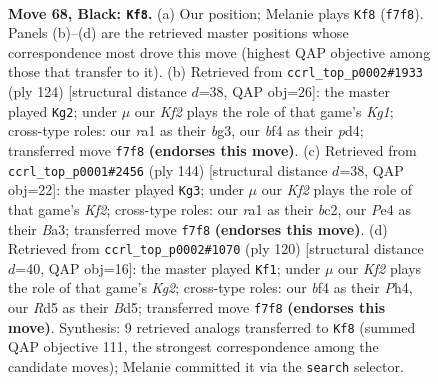 \documentclass[11pt]{article}
\begin{document}
\clearpage

\begin{figure}[p]\centering
\begin{subfigure}{0.46\textwidth}\centering
\resizebox{\linewidth}{!}{%
\newchessgame
\chessboard[
  setfen={8/n1P2k1K/p7/P2r1p1p/4pBb1/6P1/8/RN6 b - - 43 68},
  showmover=false,
  pgfstyle=straightmove, color=movearrow, markmove={f7-f8}
]}
\caption{}
\end{subfigure}\hfill
\begin{subfigure}{0.46\textwidth}\centering
\resizebox{\linewidth}{!}{%
\newchessgame
\chessboard[
  setfen={3r4/2p2k1p/1p6/pP6/P2pB3/3P2b1/2R1P3/6K1 w - - 0 63},
  showmover=false,
  pgfstyle=straightmove, color=movearrow, markmove={g1-g2}
]}
\caption{}
\end{subfigure}
\\[4pt]
\begin{subfigure}{0.46\textwidth}\centering
\resizebox{\linewidth}{!}{%
\newchessgame
\chessboard[
  setfen={8/R7/4r1p1/3k3p/p7/B6P/1Pb2KP1/8 w - - 8 73},
  showmover=false,
  pgfstyle=straightmove, color=movearrow, markmove={f2-g3}
]}
\caption{}
\end{subfigure}\hfill
\begin{subfigure}{0.46\textwidth}\centering
\resizebox{\linewidth}{!}{%
\newchessgame
\chessboard[
  setfen={1R6/2r2pk1/6p1/3B3p/3bPP1P/6P1/6K1/8 w - - 1 61},
  showmover=false,
  pgfstyle=straightmove, color=movearrow, markmove={g2-f1}
]}
\caption{}
\end{subfigure}
\caption{\textbf{Move 68, Black: \texttt{Kf8}.} (a) Our position; Melanie plays \texttt{Kf8} (\texttt{f7f8}). Panels (b)--(d) are the retrieved master positions whose correspondence most drove this move (highest QAP objective among those that transfer to it). (b) Retrieved from \texttt{ccrl\_top\_p0002\#1933} (ply 124) [structural distance $d$=38, QAP obj=26]: the master played \texttt{Kg2}; under $\mu$ our \emph{Kf2} plays the role of that game's \emph{Kg1}; cross-type roles: our \emph{r}a1 as their \emph{b}g3, our \emph{b}f4 as their \emph{p}d4; transferred move \texttt{f7f8} \textbf{(endorses this move)}. (c) Retrieved from \texttt{ccrl\_top\_p0001\#2456} (ply 144) [structural distance $d$=38, QAP obj=22]: the master played \texttt{Kg3}; under $\mu$ our \emph{Kf2} plays the role of that game's \emph{Kf2}; cross-type roles: our \emph{r}a1 as their \emph{b}c2, our \emph{P}e4 as their \emph{B}a3; transferred move \texttt{f7f8} \textbf{(endorses this move)}. (d) Retrieved from \texttt{ccrl\_top\_p0002\#1070} (ply 120) [structural distance $d$=40, QAP obj=16]: the master played \texttt{Kf1}; under $\mu$ our \emph{Kf2} plays the role of that game's \emph{Kg2}; cross-type roles: our \emph{b}f4 as their \emph{P}h4, our \emph{R}d5 as their \emph{B}d5; transferred move \texttt{f7f8} \textbf{(endorses this move)}. Synthesis: 9 retrieved analogs transferred to \texttt{Kf8} (summed QAP objective 111, the strongest correspondence among the candidate moves); Melanie committed it via the \texttt{search} selector.}
\label{fig:thought-m135}
\end{figure}
\end{document}
